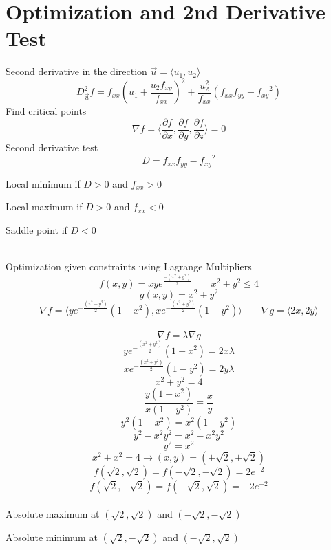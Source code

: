 \documentclass{article}
\begin{document}
\section{Optimization and 2nd Derivative Test}
Second derivative in the direction $\Vec{u} = \langle u_1, u_2 \rangle$
\[D^2_{\Vec{u}} f = f_{xx}(u_1+\frac{u_2 f_{xy}}{f_{xx}})^2+\frac{u^2_2}{f_{xx}}(f_{xx}f_{yy}-{f_{xy}}^2)\]
Find critical points
\[\nabla f = \langle \frac{\partial f}{\partial x}, \frac{\partial f}{\partial y}, \frac{\partial f}{\partial z} \rangle = 0\]
Second derivative test
\[D = f_{xx}f_{yy}-{f_{xy}}^2\]
\centerline{Local minimum if $D > 0$ and $f_{xx} > 0$}
\centerline{Local maximum if $D > 0$ and $f_{xx} < 0$}
\centerline{Saddle point if $D < 0$}
\\
Optimization given constraints using Lagrange Multipliers
\[f(x,y) = xye^\frac{-(x^2+y^2)}{2} \quad\quad x^2+y^2\leq4\]
\[g(x,y) = x^2+y^2\]
\[\nabla f = \langle ye^{-\frac{(x^2+y^2)}{2}}(1-x^2), xe^{-\frac{(x^2+y^2)}{2}}(1-y^2) \rangle \quad\quad \nabla g = \langle 2x, 2y \rangle\]
\\
\[\nabla f = \lambda \nabla g\]
\[ye^{-\frac{(x^2+y^2)}{2}}(1-x^2) = 2x\lambda\]
\[xe^{-\frac{(x^2+y^2)}{2}}(1-y^2) = 2y\lambda\]
\[x^2+y^2=4\]
\[\frac{y(1-x^2)}{x(1-y^2)} = \frac{x}{y}\]
\[y^2(1-x^2) = x^2(1-y^2)\]
\[y^2-x^2y^2 = x^2-x^2y^2\]
\[y^2=x^2\]
\[x^2 + x^2 = 4 \to (x,y) = (\pm\sqrt{2}, \pm\sqrt{2})\]
\[f(\sqrt{2}, \sqrt{2}) = f(-\sqrt{2}, -\sqrt{2}) = 2e^{-2}\]
\[f(\sqrt{2}, -\sqrt{2}) = f(-\sqrt{2}, \sqrt{2}) = -2e^{-2}\]
\\
Absolute maximum at $(\sqrt{2}, \sqrt{2})$ and $(-\sqrt{2}, -\sqrt{2})$

Absolute minimum at $(\sqrt{2}, -\sqrt{2})$ and $(-\sqrt{2}, \sqrt{2})$
\end{document}
